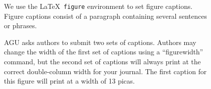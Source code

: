 
\begin{figure}
        \caption{We use the \LaTeX\ {\tt figure} environment 
        to set figure captions.  Figure captions consist of 
        a paragraph containing several sentences or phrases.}
\end{figure}

\begin{figure}
\figurewidth{13pc}
 \caption{AGU asks authors to submit two sets 
  of captions.  Authors may change the width of 
  the first set of captions using a ``figurewidth'' 
  command, but the second set of captions will 
  always print at the correct double-column width 
  for your journal.  The first caption for this 
  figure will print at a width of 13 picas.}
\end{figure}


